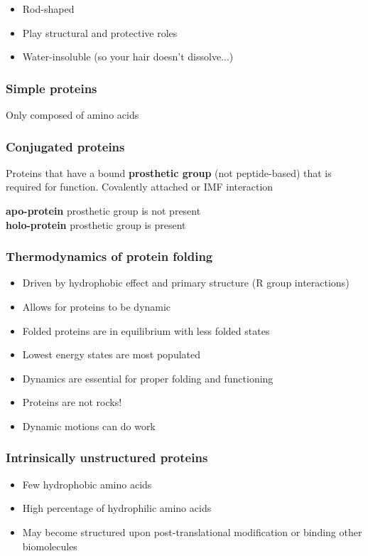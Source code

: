 \documentclass[letterpaper, 12pt]{article}
\begin{document}
\begin{itemize}
\item Rod-shaped
\item Play structural and protective roles
\item Water-insoluble (so your hair doesn't dissolve...)
\end{itemize}

\subsubsection*{Simple proteins}
Only composed of amino acids

\subsubsection*{Conjugated proteins}
Proteins that have a bound \textbf{prosthetic group} (not peptide-based) that is required for function. Covalently attached or IMF interaction

\textbf{apo-protein} prosthetic group is not present \\
\textbf{holo-protein} prosthetic group is present

\subsubsection*{Thermodynamics of protein folding}

\begin{itemize}
\item Driven by hydrophobic effect and primary structure (R group interactions)
\item Allows for proteins to be dynamic
\item Folded proteins are in equilibrium with less folded states
\item Lowest energy states are most populated
\item Dynamics are essential for proper folding and functioning
\item Proteins are not rocks!
\item Dynamic motions can do work
\end{itemize}

\subsubsection*{Intrinsically unstructured proteins}

\begin{itemize}
\item Few hydrophobic amino acids
\item High percentage of hydrophilic amino acids
\item May become structured upon post-translational modification or binding other biomolecules
\end{itemize}
\end{document}
